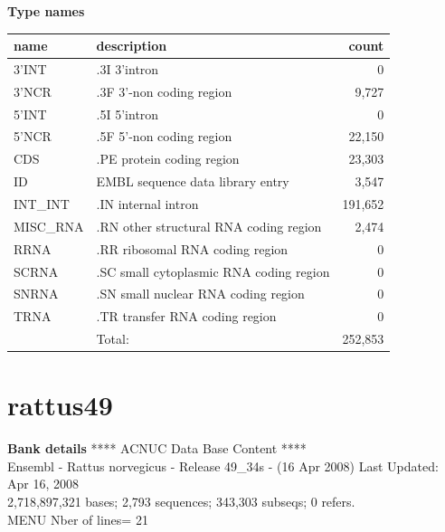 \documentclass{article}
\begin{document}
\begin{Schunk}
\textbf{Type names}
\noindent\begin{tabular}{llr}
\hline \hline
name & description & count \\
\hline
3'INT  &  .3I 3'intron  &  0 \\
3'NCR  &  .3F  3'-non coding region  &  9,727 \\
5'INT  &  .5I 5'intron  &  0 \\
5'NCR  &  .5F  5'-non coding region  &  22,150 \\
CDS  &  .PE protein coding region  &  23,303 \\
ID  &  EMBL sequence data library entry  &  3,547 \\
INT\_INT  &  .IN  internal intron  &  191,652 \\
MISC\_RNA  &  .RN other structural RNA coding region  &  2,474 \\
RRNA  &  .RR ribosomal RNA coding region  &  0 \\
SCRNA  &  .SC small cytoplasmic RNA coding region  &  0 \\
SNRNA  &  .SN small nuclear RNA coding region  &  0 \\
TRNA  &  .TR transfer RNA coding region  &  0 \\
\hline
 & Total: & 252,853 \\
\hline \hline
\end{tabular}

\section{ rattus49 }
\textbf{Bank details}
             ****     ACNUC Data Base Content      ****                         \\
Ensembl - Rattus norvegicus - Release 49\_34s - (16 Apr 2008) Last Updated: Apr 16, 2008\\
2,718,897,321 bases; 2,793 sequences; 343,303 subseqs; 0 refers.\\
MENU Nber of lines= 21                                                         


\end{Schunk}
\end{document}
